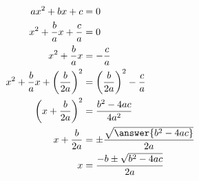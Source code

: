 \documentclass{ximera}
\begin{document}
\begin{claim}
  \lipsum[1][1-3]
\end{claim}

\begin{conclusion}
  \lipsum[1][1-3]
\end{conclusion}

\begin{condition}
  \lipsum[1][1-3]
\end{condition}

\begin{conjecture}
  \lipsum[1][1-3]
\end{conjecture}

\begin{corollary}
  \lipsum[1][1-3]
\end{corollary}

\begin{criterion}
  \lipsum[1][1-3]
\end{criterion}

\begin{definition}
  \lipsum[1][1-3]
\end{definition}

\begin{example}
  \lipsum[1][1-3]
  \begin{solution}
    \lipsum[1][1-3]
    \begin{align*}
      ax^2 + bx + c &= 0 \\
      x^2 + \frac{b}{a}x + \frac{c}{a} &= 0 \\
      x^2 + \frac{b}{a}x &= -\frac{c}{a} \\
      x^2 + \frac{b}{a}x + \left(\frac{b}{2a}\right)^2 &= \left(\frac{b}{2a}\right)^2 - \frac{c}{a} \\
      \left(x + \frac{b}{2a}\right)^2 &= \frac{b^2 - 4ac}{4a^2} \\
      x + \frac{b}{2a} &= \pm \frac{\sqrt{\answer{b^2 - 4ac}}}{2a} \\
      x &= \frac{-b \pm \sqrt{b^2 - 4ac}}{2a}
      \end{align*}
    \lipsum[1][1-3]
  \end{solution}
\end{example}

\begin{explanation}
  \lipsum[1][1-3]
\end{explanation}

\begin{fact}
  \lipsum[1][1-3]
\end{fact}
\end{document}
